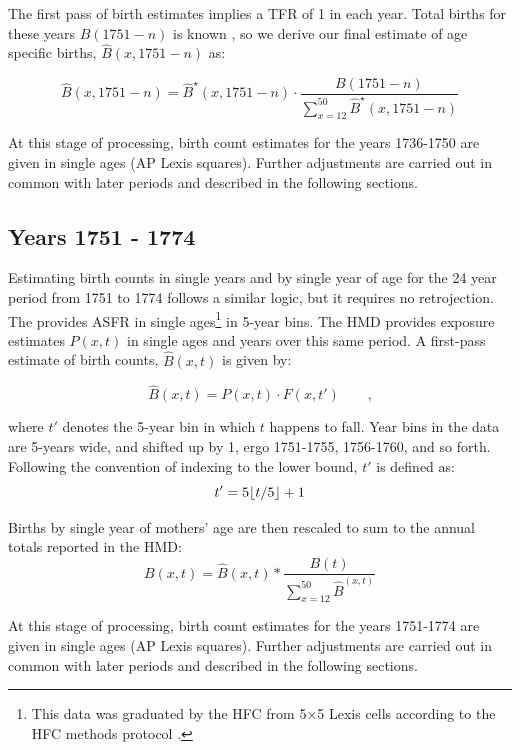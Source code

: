 \documentclass{article}
\DeclarePairedDelimiter\floor{\lfloor}{\rfloor}
\newcommand{\tc}{\quad\quad\text{,}}
\begin{document}
\begin{appendix}
The first pass of birth estimates implies a TFR of 1 in each year. Total births for these years $B(1751-n)$ is known \citep[][Tab.~27 \& Tab.~28]{sweden1969historisk}, so we derive our final estimate of age specific births, $\widehat{B}(x,1751-n)$ as:

\begin{equation}
\widehat{B}(x,1751-n) = \widehat{B}^\star(x,1751-n) \cdot \frac{B(1751-n)}{\sum _{x=12}^{50}\widehat{B}^\star(x,1751-n) }
\end{equation}

At this stage of processing, birth count estimates for the years 1736-1750 are given in single ages (AP Lexis squares). Further adjustments are carried out in common with later periods and described in the following sections.

\subsection{Years 1751 - 1774}
Estimating birth counts in single years and by single year of age for the 24 year period from 1751 to 1774 follows a similar logic, but it requires no retrojection. The \citet{HFC} provides ASFR in single ages\footnote{This data was graduated by the HFC from 5$\times$5 Lexis cells according to the HFC methods protocol \citep{grigorieva2015methods}.} in 5-year bins. The HMD provides exposure estimates $P(x,t)$ in single ages and years over this same period. A first-pass estimate of birth counts, $\widehat{B}(x,t)$ is given by:

\begin{equation}
\widehat{B}(x,t) = P(x,t) \cdot F(x,t') \tc
\end{equation}

where $t'$ denotes the 5-year bin in which $t$ happens to fall. Year bins in the data are 5-years wide, and shifted up by 1, ergo 1751-1755, 1756-1760, and so forth. Following the convention of indexing to the lower bound, $t'$ is defined as:
\begin{equation}
t' = 5\floor{t/5}+1
\end{equation}

Births by single year of mothers' age are then rescaled to sum to the annual totals reported in the HMD:
\begin{equation}
B(x,t) = \widehat{B}(x,t) * \frac{B(t)}{\sum _{x=12}^{50}\widehat{B}^(x,t)}
\end{equation}

At this stage of processing, birth count estimates for the years 1751-1774 are given in single ages (AP Lexis squares). Further adjustments are carried out in common with later periods and described in the following sections.


\end{appendix}
\end{document}
